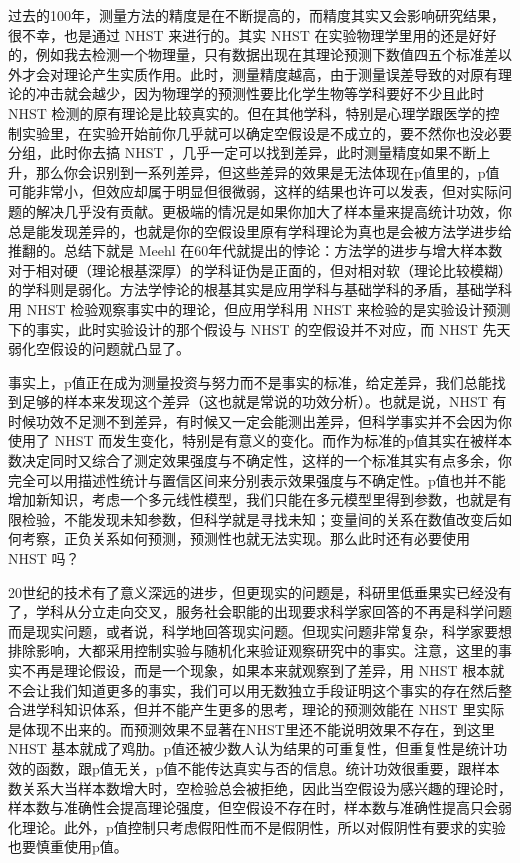 \documentclass[]{book}
\begin{document}
过去的100年，测量方法的精度是在不断提高的，而精度其实又会影响研究结果，很不幸，也是通过 NHST 来进行的。其实 NHST 在实验物理学里用的还是好好的，例如我去检测一个物理量，只有数据出现在其理论预测下数值四五个标准差以外才会对理论产生实质作用。此时，测量精度越高，由于测量误差导致的对原有理论的冲击就会越少，因为物理学的预测性要比化学生物等学科要好不少且此时 NHST 检测的原有理论是比较真实的。但在其他学科，特别是心理学跟医学的控制实验里，在实验开始前你几乎就可以确定空假设是不成立的，要不然你也没必要分组，此时你去搞 NHST ，几乎一定可以找到差异，此时测量精度如果不断上升，那么你会识别到一系列差异，但这些差异的效果是无法体现在p值里的，p值可能非常小，但效应却属于明显但很微弱，这样的结果也许可以发表，但对实际问题的解决几乎没有贡献。更极端的情况是如果你加大了样本量来提高统计功效，你总是能发现差异的，也就是你的空假设里原有学科理论为真也是会被方法学进步给推翻的。总结下就是 Meehl 在60年代就提出的悖论：方法学的进步与增大样本数对于相对硬（理论根基深厚）的学科证伪是正面的，但对相对软（理论比较模糊）的学科则是弱化。方法学悖论的根基其实是应用学科与基础学科的矛盾，基础学科用 NHST 检验观察事实中的理论，但应用学科用 NHST 来检验的是实验设计预测下的事实，此时实验设计的那个假设与 NHST 的空假设并不对应，而 NHST 先天弱化空假设的问题就凸显了。

事实上，p值正在成为测量投资与努力而不是事实的标准，给定差异，我们总能找到足够的样本来发现这个差异（这也就是常说的功效分析）。也就是说，NHST 有时候功效不足测不到差异，有时候又一定会能测出差异，但科学事实并不会因为你使用了 NHST 而发生变化，特别是有意义的变化。而作为标准的p值其实在被样本数决定同时又综合了测定效果强度与不确定性，这样的一个标准其实有点多余，你完全可以用描述性统计与置信区间来分别表示效果强度与不确定性。p值也并不能增加新知识，考虑一个多元线性模型，我们只能在多元模型里得到参数，也就是有限检验，不能发现未知参数，但科学就是寻找未知；变量间的关系在数值改变后如何考察，正负关系如何预测，预测性也就无法实现。那么此时还有必要使用 NHST 吗？

20世纪的技术有了意义深远的进步，但更现实的问题是，科研里低垂果实已经没有了，学科从分立走向交叉，服务社会职能的出现要求科学家回答的不再是科学问题而是现实问题，或者说，科学地回答现实问题。但现实问题非常复杂，科学家要想排除影响，大都采用控制实验与随机化来验证观察研究中的事实。注意，这里的事实不再是理论假设，而是一个现象，如果本来就观察到了差异，用 NHST 根本就不会让我们知道更多的事实，我们可以用无数独立手段证明这个事实的存在然后整合进学科知识体系，但并不能产生更多的思考，理论的预测效能在 NHST 里实际是体现不出来的。而预测效果不显著在NHST里还不能说明效果不存在，到这里 NHST 基本就成了鸡肋。p值还被少数人认为结果的可重复性，但重复性是统计功效的函数，跟p值无关，p值不能传达真实与否的信息。统计功效很重要，跟样本数关系大当样本数增大时，空检验总会被拒绝，因此当空假设为感兴趣的理论时，样本数与准确性会提高理论强度，但空假设不存在时，样本数与准确性提高只会弱化理论。此外，p值控制只考虑假阳性而不是假阴性，所以对假阴性有要求的实验也要慎重使用p值。
\end{document}
